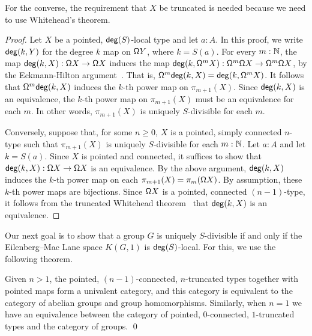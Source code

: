 For the converse, the requirement that $X$ be truncated is needed because
we need to use Whitehead's theorem.

\begin{proof}
    Let $X$ be a pointed, $\mathsf{deg}(S)$-local type and let $a : A$.
    In this proof, we write $\mathsf{deg}(k, Y)$ for the degree $k$ map on $\mathsf{\Omega} Y$,
    where $k = S(a)$.
    For every $m : \mathbb{N}$,
    the map $\mathsf{deg}(k, X) : \mathsf{\Omega} X \to \mathsf{\Omega} X$ induces
    the map $\mathsf{deg}(k, \mathsf{\Omega}^m X) : \mathsf{\Omega}^m \mathsf{\Omega} X \to \mathsf{\Omega}^m \mathsf{\Omega} X$,
    by the Eckmann-Hilton argument~\cite[Theorem~2.1.6]{hottbook}.
    That is, $\mathsf{\Omega}^m \mathsf{deg}(k, X) = \mathsf{deg}(k, \mathsf{\Omega}^m X)$.
    It follows that $\mathsf{\Omega}^m \mathsf{deg}(k, X)$ induces the $k$-th power map on $\pi_{m+1}( X )$.
    Since $\mathsf{deg}(k, X)$ is an equivalence, the $k$-th power map on $\pi_{m+1}( X )$
    must be an equivalence for each $m$.
    In other words, $\pi_{m+1}( X )$ is uniquely $S$-divisible for each $m$.

    Conversely, suppose that, for some $n \geq 0$, $X$ is a pointed,
    simply connected $n$-type such that $\pi_{m+1}(X)$ is uniquely $S$-divisible
    for each $m : \mathbb{N}$.
    Let $a : A$ and let $k = S(a)$.
    Since $X$ is pointed and connected, it suffices to show that
    $\mathsf{deg}(k, X) : \mathsf{\Omega} X \to \mathsf{\Omega} X$ is an equivalence.
    By the above argument, $\mathsf{deg}(k, X)$ induces the $k$-th power map on each
    $\pi_{m+1}(X) = \pi_m(\mathsf{\Omega} X)$.
    By assumption, these $k$-th power maps are bijections.
    Since $\mathsf{\Omega} X$ is a pointed, connected $(n-1)$-type, it follows from the
    truncated Whitehead theorem~\cite[Theorem~8.8.3]{hottbook} that 
    $\mathsf{deg}(k, X)$ is an equivalence.
\end{proof}

Our next goal is to show that a group $G$ is uniquely $S$-divisible if and only
if the Eilenberg--Mac Lane space $K(G, 1)$ is $\mathsf{deg}(S)$-local.
For this, we use the following theorem.

\begin{thm}\label{theorem:catofgroups}
    Given $n>1$, the pointed, $(n-1)$-connected, $n$-truncated types together with pointed maps
    form a univalent category, and this category is equivalent to the category of abelian groups
    and group homomorphisms.
    Similarly, when $n=1$ we have an equivalence between the category of pointed, $0$-connected,
    $1$-truncated types and the category of groups. \qed
\end{thm}

